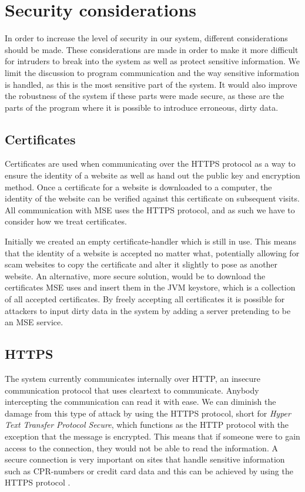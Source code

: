 \section{Security considerations}\label{sec:secure}
In order to increase the level of security in our system, different considerations should be made. These considerations are made in order to make it more difficult for intruders to break into the system as well as protect sensitive information. We limit the discussion to program communication and the way sensitive information is handled, as this is the most sensitive part of the system. It would also improve the robustness of the system if these parts were made secure, as these are the parts of the program where it is possible to introduce erroneous, dirty data.

\subsection*{Certificates}
Certificates are used when communicating over the HTTPS protocol as a way to ensure the identity of a website as well as hand out the public key and encryption method. Once a certificate for a website is downloaded to a computer, the identity of the website can be verified against this certificate on subsequent visits. All communication with MSE uses the HTTPS protocol, and as such we have to consider how we treat certificates. 

Initially we created an empty certificate-handler which is still in use. This means that the identity of a website is accepted no matter what, potentially allowing for scam websites to copy the certificate and alter it slightly to pose as another website. An alternative, more secure solution, would be to download the certificates MSE uses and insert them in the JVM keystore, which is a collection of all accepted certificates. By freely accepting all certificates it is possible for attackers to input dirty data in the system by adding a server pretending to be an MSE service.

\subsection*{HTTPS}
The system currently communicates internally over HTTP, an insecure communication protocol that uses cleartext to communicate. Anybody intercepting the communication can read it with ease. We can diminish the damage from this type of attack by using the HTTPS protocol, short for \textit{Hyper Text Transfer Protocol Secure}, which functions as the HTTP protocol with the exception that the message is encrypted. This means that if someone were to gain access to the connection, they would not be able to read the information. A secure connection is very important on sites that handle sensitive information such as CPR-numbers or credit card data and this can be achieved by using the HTTPS protocol \cite{HTTPS}.

